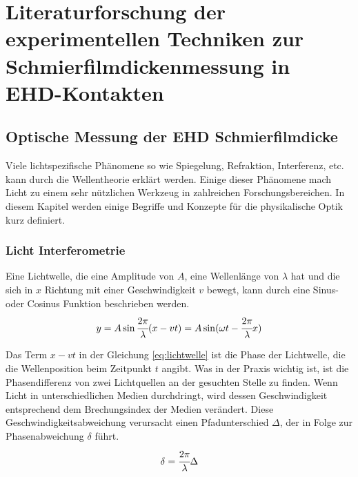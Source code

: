 \chapter{Literaturforschung der experimentellen Techniken zur Schmierfilmdickenmessung in EHD-Kontakten}
\label{chap:literaturforschung_der_experimentellen_technik_in_ehd_schmierung}

\section{Optische Messung der EHD Schmierfilmdicke}
\label{sec:optische_messung_der_ehd_schmierfilmdicke}

Viele lichtspezifische Phänomene so wie Spiegelung, Refraktion, Interferenz, etc. kann durch die Wellentheorie erklärt werden.
Einige dieser Phänomene mach Licht zu einem sehr nützlichen Werkzeug in zahlreichen Forschungsbereichen.
In diesem Kapitel werden einige Begriffe und Konzepte für die physikalische Optik kurz definiert.

\subsection{Licht Interferometrie}
\label{ssec:licht_interferometrie}

Eine Lichtwelle, die eine Amplitude von $A$, eine Wellenlänge von $\lambda$ hat und die sich in $x$ Richtung mit einer Geschwindigkeit $v$ bewegt, kann durch eine Sinus- oder Cosinus Funktion beschrieben werden.
\begin{equation}
        y = A \sin \cfrac{2 \pi}{\lambda} (x - v t) = A \sin (\omega t - \cfrac{2 \pi}{\lambda} x)
    \label{eq:lichtwelle}
\end{equation}
%

Das Term $x - v t$ in der Gleichung \ref{eq:lichtwelle} ist die Phase der Lichtwelle, die die Wellenposition beim Zeitpunkt $t$ angibt.
Was in der Praxis wichtig ist, ist die Phasendifferenz von zwei Lichtquellen an der gesuchten Stelle zu finden.
Wenn Licht in unterschiedlichen Medien durchdringt, wird dessen Geschwindigkeit entsprechend dem Brechungsindex der Medien verändert.
Diese Geschwindigkeitsabweichung verursacht einen Pfadunterschied $\Delta$, der in Folge zur Phasenabweichung $\delta$ führt.
\begin{equation}
    \delta = \cfrac{2 \pi}{\lambda} \Delta
    \label{eq:licht_phasenabweichung}
\end{equation}
%

